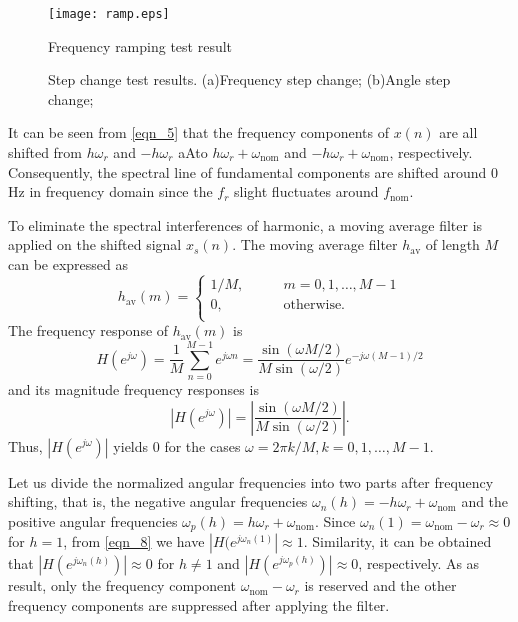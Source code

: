 \documentclass[journal,twoside]{IEEEtran}
\begin{document}
\begin{figure}[t]
	\centering
	\texttt{[image: ramp.eps]}
	\caption{Frequency ramping test result}
	\label{fig_5}									
\end{figure}

\begin{figure}
	\centering
	
 \caption{Step change test results.
		(a)Frequency step change; (b)Angle  step change;}	\label{fig_6}
\end{figure}


It can be seen from  \eqref{eqn_5} that the frequency components of $x(n)$ are all shifted  from $h\omega_r$ and $-h\omega_r$ aAto $h\omega_r+\omega_\mathrm{nom}$ and $-h\omega_r+\omega_\mathrm{nom}$, respectively. Consequently, the spectral line of fundamental components are shifted around 0 Hz in frequency domain since the $f_r$ slight fluctuates around $f_\mathrm{nom}$.

To eliminate the spectral interferences of harmonic, a moving average filter is applied on the shifted signal $x_s(n)$. The  moving average filter $h_\mathrm{av}$ of length $M$ can be expressed as 
\begin{equation}
h_\mathrm{av}(m)=\begin{cases}
1/M,\qquad &m=0,1,\ldots,M-1\\
0, &\text{otherwise.}\\
\end{cases}\label{eqn_6}
\end{equation}
The frequency response of $h_\mathrm{av}(m)$ is
\begin{equation}
H(e^{j\omega})=\dfrac{1}{M}\sum_{n=0}^{M-1}e^{j\omega n}=\dfrac{\sin(\omega M/2)}{M\sin(\omega/2)}e^{-j\omega (M-1)/2}\label{eqn_7}
\end{equation}
and its magnitude frequency responses is
\begin{equation}
|H(e^{j\omega })|=\left|\dfrac{\sin(\omega M/2)}{M\sin(\omega/2)}\right|\mathrm{.}\label{eqn_8}
\end{equation}
Thus, $|H(e^{j\omega })|$ yields $0$ for the cases $\omega=2\pi k/M,k=0,1,\ldots,M-1$.

Let us divide the normalized angular frequencies into two parts after frequency shifting, that is, the negative angular frequencies $\omega_n(h)=-h\omega_r+\omega_\mathrm{nom}$ and the positive angular frequencies $\omega_p(h)=h\omega_r+\omega_\mathrm{nom}$. Since $\omega_n(1)=\omega_\mathrm{nom}-\omega_r\approx0$ for $h=1$, from \eqref{eqn_8} we have $|H(e^{j\omega_n(1)}|\approx1$. Similarity, it can be obtained that $|H(e^{j\omega_n(h)})|\approx0$ for $h\neq1$ and $|H(e^{j\omega_p(h)})|\approx0$, respectively. As as result, only the frequency component $\omega_\mathrm{nom}-\omega_r$ is reserved and the other frequency components are suppressed after applying the  filter.
\end{document}
